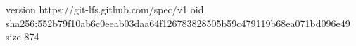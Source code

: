 version https://git-lfs.github.com/spec/v1
oid sha256:552b79f10ab6c0eeab03daa64f126783828505b59c479119b68ea071bd096e49
size 874
